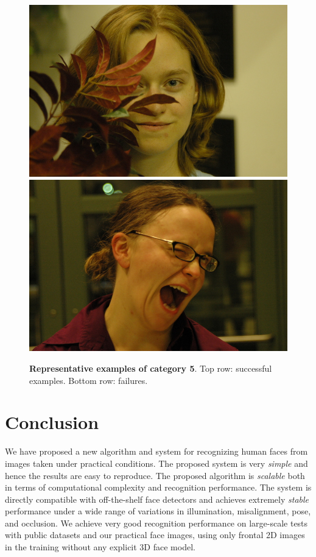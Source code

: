\begin{figure}
\includegraphics[scale=0.35,clip=true]{figures_cvpr/examples/5/failure/DSC_1917.jpg} 
\includegraphics[scale=0.35,clip=true]{figures_cvpr/examples/5/failure/DSC_2008.jpg} 
 \caption{{\bf Representative examples of category 5}. Top row: successful examples. Bottom row: failures.\vspace{0mm}}\label{fig:examples5}
\end{figure}

\vspace{0mm}
\section{Conclusion}\vspace{0mm}
We have proposed a new algorithm and system for recognizing human faces from images taken under practical conditions. The proposed system is very {\em simple} and hence the results are easy to reproduce. The proposed algorithm is {\em scalable} both in terms of computational complexity and recognition performance. The system is directly compatible with off-the-shelf face detectors and achieves extremely {\em stable} performance under a wide range of variations in illumination, misalignment, pose, and occlusion. We achieve very good recognition performance on large-scale tests with public datasets and our practical face images, using only frontal 2D images in the training without any explicit 3D face model. 

%
%
%

%

